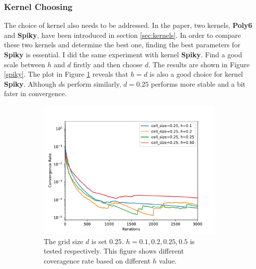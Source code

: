     \subsubsection{Kernel Choosing}
    The choice of kernel also needs to be addressed. In the paper, two kernels, \textbf{Poly6} and \textbf{Spiky}, have been introduced in section \ref{sec:kernels}. In order to compare these two kernels and determine the best one, finding the best parameters for \textbf{Spiky} is essential. I did the same experiment with kernel \textbf{Spiky}. Find a good scale between $h$ and $d$ firstly and then choose $d$. The results are shown in Figure \ref{spiky}. The plot in Figure \ref{fig:spikynum} reveals that $h=d$ is also a good choice for kernel \textbf{Spiky}. Although $d$s perform similarly, $d=0.25$ performs more stable and a bit fater in convergence. 
    \begin{figure}[!ht]
        \centering
        \begin{subfigure}[b]{0.7\textwidth}
            \includegraphics[width=\textwidth]{Figures/spiky25.pdf}
            \caption{The grid size $d$ is set $0.25$. $h=0.1, 0.2, 0.25, 0.5$ is tested respectively. This figure shows different coveragence rate based on different $h$ value.}
            \label{fig:spikynum}
        \end{subfigure}
        \begin{subfigure}[b]{0.7\textwidth}

\end{subfigure}
\end{figure}
